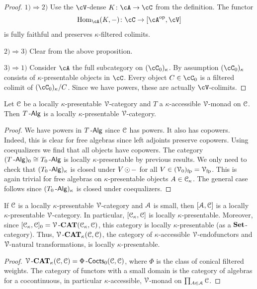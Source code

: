 \documentclass[a4paper,11pt,oneside,openany]{scrbook}
\begin{document}
\begin{proof}
\item[$ 1)\Rightarrow 2) $]
    Use the $ \cV $-dense $ K \from \cA \to \cC $ from the definition.
    The functor
    \begin{displaymath}
	\Hom_{\cA}(K,-)\from \cC \to [\cA^{\op},\cV]
    \end{displaymath}
    is fully faithful and preserves $ \kappa $-filtered colimits.
\item[$ 2) \Rightarrow 3) $]
    Clear from the above proposition.
\item[$ 3) \Rightarrow 1) $]
    Consider $ \cA $ the full subcategory on $ (\cC_0)_\kappa $.
    By assumption $ (\cC_0)_\kappa $ consists of $ \kappa $-presentable objects in $ \cC $.
    Every object $ C \in\cC_0 $ is a filtered colimit of $ (\cC_0)_\kappa / C $.
    Since we have powers, these are actually $ \cV $-colimits.
\end{proof}
\begin{cor}
    Let $\operatorname{\mathcal{C}}$ be a locally $\kappa$-presentable $\operatorname{\mathcal{V}}$-category and $T$ a $\kappa$-accessible $\operatorname{\mathcal{V}}$-monad on $\operatorname{\mathcal{C}}$. Then $T\operatorname{-\mathsf{Alg}}$ is a locally $\kappa$-presentable $\operatorname{\mathcal{V}}$-category.
\end{cor}
\begin{proof}
We have powers in $T\operatorname{-\mathsf{Alg}}$ since $\operatorname{\mathcal{C}}$ has powers. It also has copowers. Indeed, this is clear for free algebras since left adjoints preserve copowers. Using coequalizers we find that all objects have copowers. The category $(T\operatorname{-\mathsf{Alg}})_0\cong T_0\operatorname{-\mathsf{Alg}}$ is locally $\kappa$-presentable by previous results. We only need to check that $(T_0\operatorname{-\mathsf{Alg}})_{\kappa}$ is closed under $V\operatorname{\odot}-$ for all $V\in(\operatorname{\mathcal{V}}_0)_{\text{fp}}=\operatorname{\mathcal{V}}_{\text{fp}}$. This is again trivial for free algebras on $\kappa$-presentable objects $A\in\operatorname{\mathcal{C}}_\kappa$. The general case follows since $(T_0\operatorname{-\mathsf{Alg}})_\kappa$ is closed under coequalizers. 
\end{proof}
\begin{cor}
If $\operatorname{\mathcal{C}}$ is a locally $\kappa$-presentable $\operatorname{\mathcal{V}}$-category and $\operatorname{\mathcal{A}}$ is small, then $[\operatorname{\mathcal{A}},\operatorname{\mathcal{C}}]$ is a locally $\kappa$-presentable $\operatorname{\mathcal{V}}$-category. In particular, $[\operatorname{\mathcal{C}}_\kappa, \operatorname{\mathcal{C}}]$ is locally $\kappa$-presentable. Moreover, since  $[\operatorname{\mathcal{C}}_\kappa, \operatorname{\mathcal{C}}]_0 = \operatorname{\mathcal{V}}\mbox{-}{\normalfont\textbf{CAT}}(\operatorname{\mathcal{C}}_\kappa,\operatorname{\mathcal{C}})$, this category is locally $\kappa$-presentable (as a ${\normalfont\textbf{Set}}$-category). Thus, $\operatorname{\mathcal{V}}\mbox{-}{\normalfont\textbf{CAT}}_\kappa(\operatorname{\mathcal{C}},\operatorname{\mathcal{C}})$, the category of $\kappa$-accessible $\operatorname{\mathcal{V}}$-endofunctors and $\operatorname{\mathcal{V}}$-natural transformations, is locally $\kappa$-presentable.
\end{cor}
\begin{proof}
$\operatorname{\mathcal{V}}\mbox{-}{\normalfont\textbf{CAT}}_\kappa(\operatorname{\mathcal{C}},\operatorname{\mathcal{C}})=\Phi\operatorname{-\mathsf{Cocts}}_0(\operatorname{\mathcal{C}},\operatorname{\mathcal{C}})$, where $\Phi$ is the class of conical filtered weights. The category of functors with a small domain is the category of algebras for a cocontinuous, in particular $\kappa$-accessible, $\operatorname{\mathcal{V}}$-monad on $\prod_{A\in\operatorname{\mathcal{A}}}\operatorname{\mathcal{C}}$.
\end{proof}
\end{document}
